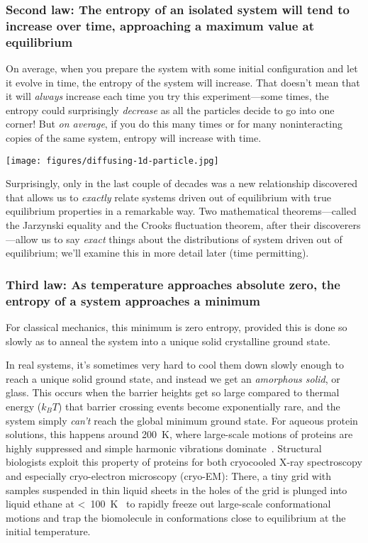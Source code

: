 \documentclass[english,course]{lecture}
\begin{document}
\subsubsection{Second law: The entropy of an isolated system will tend to increase over time, approaching a maximum value at equilibrium}

On average, when you prepare the system with some initial configuration and let it evolve in time, the entropy of the system will increase.
That doesn't mean that it will \emph{always} increase each time you try this experiment---some times, the entropy could surprisingly \emph{decrease} as all the particles decide to go into one corner!
But \emph{on average}, if you do this many times or for many noninteracting copies of the same system, entropy will increase with time.

\begin{centering}
\texttt{[image: figures/diffusing-1d-particle.jpg]}

\end{centering}

Surprisingly, only in the last couple of decades was a new relationship discovered that allows us to \emph{exactly} relate systems driven out of equilibrium with true equilibrium properties in a remarkable way.
Two mathematical theorems---called the Jarzynski equality and the Crooks fluctuation theorem, after their discoverers---allow us to say \emph{exact} things about the distributions of system driven out of equilibrium; we'll examine this in more detail later (time permitting).

\subsubsection{Third law: As temperature approaches absolute zero, the entropy of a system approaches a minimum}

For classical mechanics, this minimum is zero entropy, provided this is done so slowly as to anneal the system into a unique solid crystalline ground state.

In real systems, it's sometimes very hard to cool them down slowly enough to reach a unique solid ground state, and instead we get an \emph{amorphous solid}, or glass.
This occurs when the barrier heights get so large compared to thermal energy ($k_B T$) that barrier crossing events become exponentially rare, and the system simply \emph{can't} reach the global minimum ground state.
For aqueous protein solutions, this happens around 200~K, where large-scale motions of proteins are highly suppressed and simple harmonic vibrations dominate~\cite{ringe2003glass}.
Structural biologists exploit this property of proteins for both cryocooled X-ray spectroscopy and especially cryo-electron microscopy (cryo-EM): There, a tiny grid with samples suspended in thin liquid sheets in the holes of the grid is plunged into liquid ethane at <~100~K~\cite{russo2016precision} to rapidly freeze out large-scale conformational motions and trap the biomolecule in conformations close to equilibrium at the initial temperature.
\end{document}
